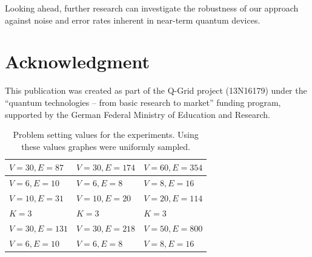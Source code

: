 \documentclass[conference]{IEEEtran}
\theoremstyle{plain}
\theoremstyle{definition}
\theoremstyle{remark}
\begin{document}
Looking ahead, further research can investigate the robustness of our approach against noise and error rates inherent in near-term quantum devices.


\section*{Acknowledgment}
This publication was created as part of the Q-Grid project (13N16179) under the ``quantum technologies -- from basic research to market'' funding program, supported by the German Federal Ministry of Education and Research.





\appendix

\begin{table}[H]
  \centering
    \begin{tabular}{|l|l|l|} \hline
         $V=30, E=87$ & $V=30, E=174$ & $V=60, E=354$ \\\hline
         $V=6, E=10$ & $V=6, E=8$ & $V=8, E=16$ \\\hline
         $V=10, E=31$ & $V=10, E=20$ & $V=20, E=114$ \\
         $K=3$ & $K=3$ & $K=3$ \\\hline
         $V=30, E=131$ & $V=30, E=218$ & $V=50, E=800$ \\\hline
         $V=6, E=10$ & $V=6, E=8$ & $V=8, E=16$ \\\hline
    \end{tabular}
    \vspace{1em}
    \caption{Problem setting values for the experiments. Using these values graphes were uniformly sampled.}
\end{table}
\end{document}
